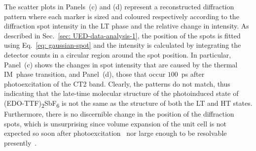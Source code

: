 The scatter plots in Panels~(c) and (d) represent a reconstructed diffraction pattern where each marker
is sized and coloured respectively according to the diffraction spot intensity in the LT phase and
the relative change in intensity. As described in Sec.~\ref{sec: UED-data-analysis-1},
the position of the spots is fitted using Eq.~\eqref{eq: gaussian-spot} and
the intensity is calculated by integrating the detector counts in a circular region around the spot position.
%
In particular, Panel~(c) shows the changes in spot intensity that are caused by
the thermal IM~phase transition, and Panel~(d),
those that occur $100$~ps after photoexcitation of the CT2 band.
Clearly, the patterns do not match, thus indicating that the late-time molecular structure of
the photoinduced state of (EDO-TTF)\textsubscript{2}SbF\textsubscript{6} is not the same as
the structure of both the LT and HT states.
Furthermore, there is no discernible change in the position of the diffraction spots,
which is unsurprising since volume expansion of the unit cell is not expected
so soon after photoexcitation~\cite{Lorenc2009}
nor large enough to be resolvable presently~\cite{Gao2013}.

